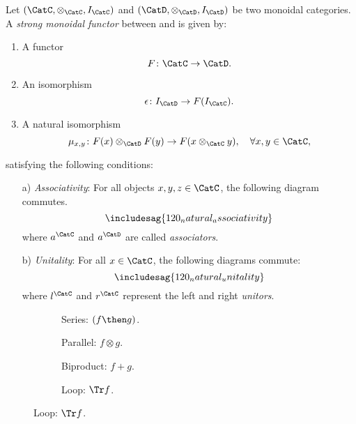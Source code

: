 \begin{ctdefinition}
Let $(\CatC,\otimes_\CatC,I_\CatC)$ and $(\CatD,\otimes_\CatD,I_\CatD)$ be two monoidal categories. A \emph{strong monoidal functor} between \CatC and \CatD is given by:
\begin{enumerate}
    \item A functor
    \begin{equation}
        F\colon \CatC\to \CatD.
    \end{equation}
    \item An isomorphism
    \begin{equation}
        \epsilon\colon I_\CatD\to F(I_\CatC).
    \end{equation}
    \item A natural isomorphism
    \begin{equation}
        \mu_{x,y}\colon F(x)\otimes_\CatD F(y) \to F(x\otimes_\CatC y),\quad \forall x,y\in \CatC,
    \end{equation}
\end{enumerate}
satisfying the following conditions:
\begin{enumerate}
    \item[a)] \emph{Associativity}: For all objects $x,y,z\in \CatC$, the following diagram commutes.
    \begin{equation}
        \includesag{120_natural_associativity}
    \end{equation}
    where $a^\CatC$ and $a^\CatD$ are called \emph{associators}.
    \item[b)] \emph{Unitality}: For all $x\in \CatC$, the following diagrams commute:
    \begin{equation}
        \includesag{120_natural_unitality}
    \end{equation}
    where $l^\CatC$ and $r^\CatC$ represent the left and right \emph{unitors}.
\end{enumerate}
\end{ctdefinition}


\begin{figure}[h!]
\centering
\begin{subfigure}{0.2\textwidth}
\centering
{}
\caption{Series: $(f \then g)$.}
\end{subfigure}
\hspace{10mm} %
\begin{subfigure}{0.2\textwidth}
\centering
{}
\caption{Parallel: $f \otimes g$.}
\end{subfigure}
\hspace{10mm} %
\begin{subfigure}{0.2\textwidth}
\centering
{}
\caption{Biproduct: $f + g$.}
\end{subfigure}
\hspace{10mm} %
\begin{subfigure}{0.2\textwidth}
\centering
{}
\caption{Loop: $\Tr f$.}
\end{subfigure}
\label{fig:diagrams}
\end{figure}

